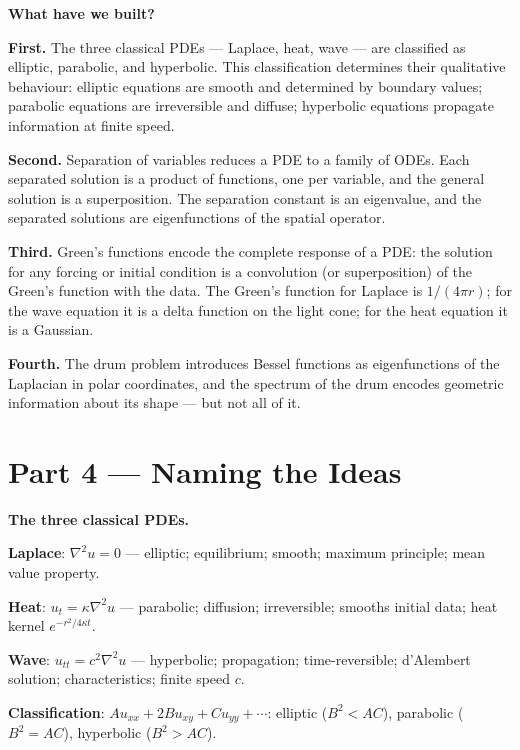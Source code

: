 \documentclass[12pt,a4paper]{article}
\newcounter{problem}
\begin{document}
\begin{discoverybox}
\textbf{What have we built?}

\textbf{First.} The three classical PDEs --- Laplace, heat, wave --- are classified as elliptic, parabolic, and hyperbolic. This classification determines their qualitative behaviour: elliptic equations are smooth and determined by boundary values; parabolic equations are irreversible and diffuse; hyperbolic equations propagate information at finite speed.

\textbf{Second.} Separation of variables reduces a PDE to a family of ODEs. Each separated solution is a product of functions, one per variable, and the general solution is a superposition. The separation constant is an eigenvalue, and the separated solutions are eigenfunctions of the spatial operator.

\textbf{Third.} Green's functions encode the complete response of a PDE: the solution for any forcing or initial condition is a convolution (or superposition) of the Green's function with the data. The Green's function for Laplace is $1/(4\pi r)$; for the wave equation it is a delta function on the light cone; for the heat equation it is a Gaussian.

\textbf{Fourth.} The drum problem introduces Bessel functions as eigenfunctions of the Laplacian in polar coordinates, and the spectrum of the drum encodes geometric information about its shape --- but not all of it.
\end{discoverybox}

\section{Part 4 \texorpdfstring{---}{--} Naming the Ideas}

\begin{namebox}
\textbf{The three classical PDEs.}

\textbf{Laplace}: $\nabla^2 u = 0$ --- elliptic; equilibrium; smooth; maximum principle; mean value property.

\textbf{Heat}: $u_t = \kappa\nabla^2 u$ --- parabolic; diffusion; irreversible; smooths initial data; heat kernel $e^{-r^2/4\kappa t}$.

\textbf{Wave}: $u_{tt} = c^2\nabla^2 u$ --- hyperbolic; propagation; time-reversible; d'Alembert solution; characteristics; finite speed $c$.

\textbf{Classification}: $Au_{xx}+2Bu_{xy}+Cu_{yy}+\cdots$: elliptic ($B^2<AC$), parabolic ($B^2=AC$), hyperbolic ($B^2>AC$).
\end{namebox}
\end{document}
